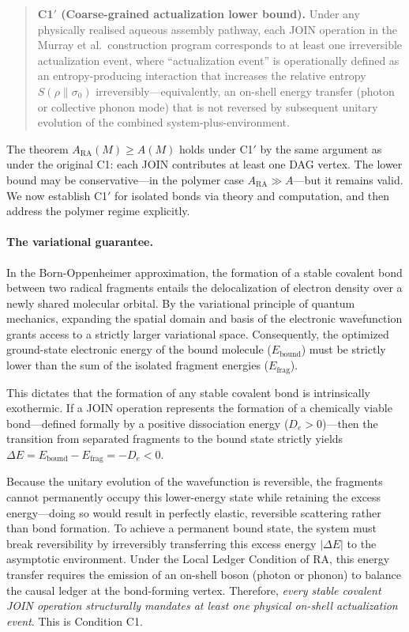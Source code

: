 \documentclass[11pt,a4paper]{article}
\theoremstyle{plain}
\theoremstyle{definition}
\theoremstyle{remark}
\newcommand{\ARA}{A_{\mathrm{RA}}}
\begin{document}
\begin{quote}
\textbf{C1$'$ (Coarse-grained actualization lower bound).} Under any physically
realised aqueous assembly pathway, each JOIN operation in the Murray et al.\
construction program corresponds to at least one irreversible actualization event,
where ``actualization event'' is operationally defined as an entropy-producing
interaction that increases the relative entropy $S(\rho \| \sigma_0)$
irreversibly---equivalently, an on-shell energy transfer (photon or collective
phonon mode) that is not reversed by subsequent unitary evolution of the combined
system-plus-environment.
\end{quote}

The theorem $\ARA(M) \geq A(M)$ holds under C1$'$ by the same argument as under
the original C1: each JOIN contributes at least one DAG vertex. The lower bound
may be conservative---in the polymer case $\ARA \gg A$---but it remains valid.
We now establish C1$'$ for isolated bonds via theory and computation, and then
address the polymer regime explicitly.

\paragraph{The variational guarantee.}
In the Born-Oppenheimer approximation, the formation of a stable covalent bond
between two radical fragments entails the delocalization of electron density over a
newly shared molecular orbital. By the variational principle of quantum mechanics,
expanding the spatial domain and basis of the electronic wavefunction grants access
to a strictly larger variational space. Consequently, the optimized ground-state
electronic energy of the bound molecule ($E_{\text{bound}}$) must be strictly lower
than the sum of the isolated fragment energies ($E_{\text{frag}}$).

This dictates that the formation of any stable covalent bond is intrinsically
exothermic. If a JOIN operation represents the formation of a chemically viable
bond---defined formally by a positive dissociation energy ($D_e > 0$)---then the
transition from separated fragments to the bound state strictly yields
$\Delta E = E_{\text{bound}} - E_{\text{frag}} = -D_e < 0$.

Because the unitary evolution of the wavefunction is reversible, the fragments
cannot permanently occupy this lower-energy state while retaining the excess
energy---doing so would result in perfectly elastic, reversible scattering rather
than bond formation. To achieve a permanent bound state, the system must break
reversibility by irreversibly transferring this excess energy $|\Delta E|$ to the
asymptotic environment. Under the Local Ledger Condition of RA, this energy
transfer requires the emission of an on-shell boson (photon or phonon) to balance
the causal ledger at the bond-forming vertex. Therefore, \emph{every stable
covalent JOIN operation structurally mandates at least one physical on-shell
actualization event}. This is Condition C1.
\end{document}
